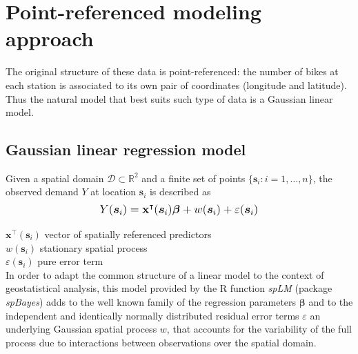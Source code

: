 \documentclass[12pt]{article}
\begin{document}


\section{Point-referenced modeling approach}


The original structure of these data is point-referenced: the number of bikes at each station is associated to its own pair of coordinates (longitude and latitude). Thus the natural model that best suits such type of data is a Gaussian linear model.
	
	\subsection{Gaussian linear regression model}


Given a spatial domain $\mathcal{D} \subset \mathbb{R}^2$ and a finite set of points $\{\boldsymbol{s}_i : i = 1, \dots , n \}$, the observed demand $Y$ at location $\boldsymbol{s}_i$ is described as
$$\begin{large}Y(\boldsymbol{s}_i) = \mathbf{x}^\intercal (\boldsymbol{s}_i) \boldsymbol{\beta} + w(\boldsymbol{s}_i) + \varepsilon(\boldsymbol{s}_i) \end{large}$$ %

\noindent
$\mathbf{x}^\intercal (\boldsymbol{s}_i)$ vector of spatially referenced predictors\\
$w(\boldsymbol{s}_i)$ stationary spatial process\\
$\varepsilon(\boldsymbol{s}_i)$ pure error term \\
	
\noindent
In order to adapt the common structure of a linear model to the context of geostatistical analysis, this model provided by the R function \emph{spLM} (package \emph{spBayes}) adds to the well known family of the regression parameters $\boldsymbol{\beta}$ and to the independent and identically normally distributed residual error terms $\varepsilon$ an underlying Gaussian spatial process $w$, that accounts for the variability of the full process due to interactions between observations over the spatial domain.
	
\end{document}
